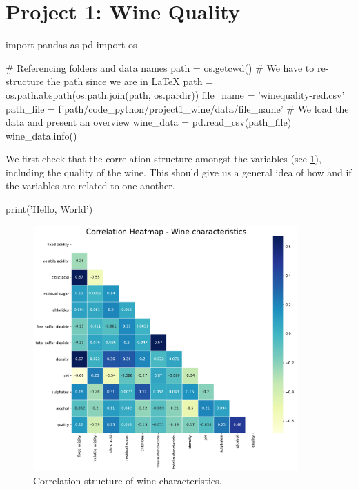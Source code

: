 \documentclass[11pt]{article}
\begin{document}
\part[wine]{Project 1: Wine Quality}


\begin{pyconsole}[][frame=single]
import pandas as pd
import os

# Referencing folders and data names
path = os.getcwd()
# We have to re-structure the path since we are in LaTeX
path = os.path.abspath(os.path.join(path, os.pardir))
file_name = 'winequality-red.csv'
path_file = f'{path}/code_python/project1_wine/data/{file_name}'
# We load the data and present an overview
wine_data = pd.read_csv(path_file)
wine_data.info()
\end{pyconsole}

We first check that the correlation structure amongst the variables (see \cref{fig:wine_heatmap}),
including the quality of the wine.
This should give us a general idea of how and if the variables are related to one another.

\begin{pycode}
print('Hello, World')
\end{pycode}

\begin{figure}[h!]
    \includegraphics[width=0.9\textwidth]{figs/wine_heatmap}
    \caption{Correlation structure of wine characteristics.}
    \label{fig:wine_heatmap}
\end{figure}
\end{document}
